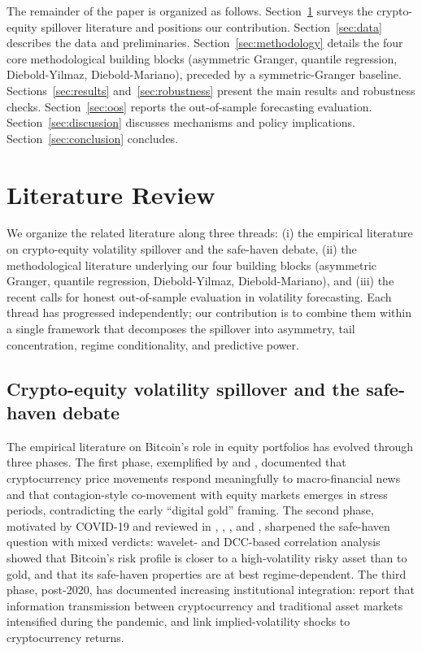 \documentclass[11pt,a4paper]{article}
\begin{document}
The remainder of the paper is organized as follows. Section~\ref{sec:lit} surveys the crypto-equity spillover literature and positions our contribution. Section~\ref{sec:data} describes the data and preliminaries. Section~\ref{sec:methodology} details the four core methodological building blocks (asymmetric Granger, quantile regression, Diebold-Yilmaz, Diebold-Mariano), preceded by a symmetric-Granger baseline. Sections~\ref{sec:results} and~\ref{sec:robustness} present the main results and robustness checks. Section~\ref{sec:oos} reports the out-of-sample forecasting evaluation. Section~\ref{sec:discussion} discusses mechanisms and policy implications. Section~\ref{sec:conclusion} concludes.

\section{Literature Review}
\label{sec:lit}

We organize the related literature along three threads: (i) the empirical literature on crypto-equity volatility spillover and the safe-haven debate, (ii) the methodological literature underlying our four building blocks (asymmetric Granger, quantile regression, Diebold-Yilmaz, Diebold-Mariano), and (iii) the recent calls for honest out-of-sample evaluation in volatility forecasting. Each thread has progressed independently; our contribution is to combine them within a single framework that decomposes the spillover into asymmetry, tail concentration, regime conditionality, and predictive power.

\subsection{Crypto-equity volatility spillover and the safe-haven debate}

The empirical literature on Bitcoin's role in equity portfolios has evolved through three phases. The first phase, exemplified by \citet{corbet2018} and \citet{matkovskyy2019}, documented that cryptocurrency price movements respond meaningfully to macro-financial news and that contagion-style co-movement with equity markets emerges in stress periods, contradicting the early ``digital gold'' framing. The second phase, motivated by COVID-19 and reviewed in \citet{bouri2020}, \citet{conlon2020}, \citet{shahzad2019}, and \citet{klein2018}, sharpened the safe-haven question with mixed verdicts: wavelet- and DCC-based correlation analysis showed that Bitcoin's risk profile is closer to a high-volatility risky asset than to gold, and that its safe-haven properties are at best regime-dependent. The third phase, post-2020, has documented increasing institutional integration: \citet{yarovaya2022} report that information transmission between cryptocurrency and traditional asset markets intensified during the pandemic, and \citet{akyildirim2020} link implied-volatility shocks to cryptocurrency returns.
\end{document}
